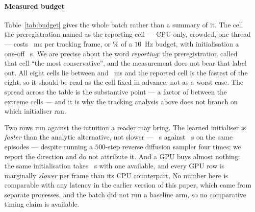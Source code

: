 \documentclass[review]{elsarticle}
\begin{document}
\paragraph{Measured budget}
Table~\ref{tab:budget} gives the whole batch rather than a summary of it. The cell
the preregistration named as the reporting cell --- CPU-only, crowded, one thread ---
costs \FrameMsLearn{}~ms per tracking frame, or \FramePctLearn{}\% of a $10$~Hz
budget, with initialisation a one-off \InitSLearn{}~s. We are precise about the word
\emph{reporting}: the preregistration called that cell ``the most conservative'', and
the measurement does not bear that label out. All eight cells lie between \FrameMsMin{} and \FrameMsMax{}~ms and the
reported cell is the fastest of the eight, so it should be read as the cell fixed in
advance, not as a worst case. The spread across the table is the substantive point ---
a factor of \FrameMsSpread{} between the extreme cells --- and it is why the tracking analysis above does
not branch on which initialiser ran.

Two rows run against the intuition a reader may bring. The learned initialiser is
\emph{faster} than the analytic alternative, not slower --- \InitSLearn{}~s against
\InitSAna{}~s on the same episodes --- despite running a $500$-step reverse diffusion
sampler four times; we report the direction and do not attribute it. And a GPU buys
almost nothing: the same initialisation takes \InitSLearnGpu{}~s with one available,
and every GPU row is marginally \emph{slower} per frame than its CPU counterpart.
No number here is comparable with any latency in the earlier version of this paper,
which came from separate processes, and the batch did not run a baseline arm, so no
comparative timing claim is available.


\end{document}
